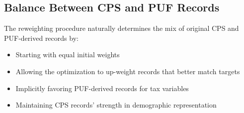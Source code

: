 \subsection{Balance Between CPS and PUF Records}

The reweighting procedure naturally determines the mix of original CPS and PUF-derived records by:
\begin{itemize}
    \item Starting with equal initial weights
    \item Allowing the optimization to up-weight records that better match targets
    \item Implicitly favoring PUF-derived records for tax variables
    \item Maintaining CPS records' strength in demographic representation
\end{itemize}

